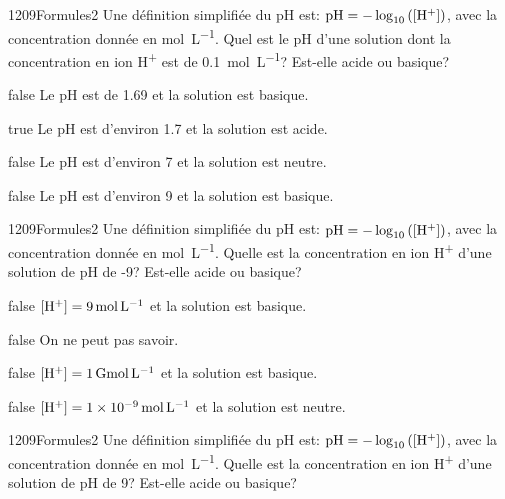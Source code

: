 		\begin{question}{1209}{Formules}{2}{}
            Une définition simplifiée du pH est: $\text{pH} = -\log_{10}\left(\text{[H\textsuperscript{+}]}\right)$, avec la concentration donnée en \si{\mol\per\liter}. Quel est le pH d'une solution dont la concentration en ion H\textsuperscript{+} est de \SI{0.1}{\mol\per\liter}? Est-elle acide ou basique?
        \end{question}
        \begin{reponses}
    	    \item[false] Le pH est de \num{1.69} et la solution est basique.
    	    \item[true] Le pH est d'environ \num{1.7} et la solution est acide.
    	    \item[false] Le pH est d'environ \num{7} et la solution est neutre.
    	    \item[false] Le pH est d'environ \num{9} et la solution est basique.
        \end{reponses}
		\begin{question}{1209}{Formules}{2}{}
            Une définition simplifiée du pH est: $\text{pH} = -\log_{10}\left(\text{[H\textsuperscript{+}]}\right)$, avec la concentration donnée en \si{\mol\per\liter}. Quelle est la concentration en ion H\textsuperscript{+} d'une solution de pH de -9? Est-elle acide ou basique?
        \end{question}
        \begin{reponses}
    	    \item[false] $\text{[H\textsuperscript{+}]} = \SI{9}{\mol\per\liter}$ et la solution est basique.
    	    \item[false] On ne peut pas savoir.
    	    \item[false] $\text{[H\textsuperscript{+}]} = \SI{1}{\giga\mol\per\liter}$ et la solution est basique.
    	    \item[false] $\text{[H\textsuperscript{+}]} = \SI{1e-9}{\mol\per\liter}$ et la solution est neutre.
        \end{reponses}
		\begin{question}{1209}{Formules}{2}{}
            Une définition simplifiée du pH est: $\text{pH} = -\log_{10}\left(\text{[H\textsuperscript{+}]}\right)$, avec la concentration donnée en \si{\mol\per\liter}. Quelle est la concentration en ion H\textsuperscript{+} d'une solution de pH de 9? Est-elle acide ou basique?
        \end{question}
